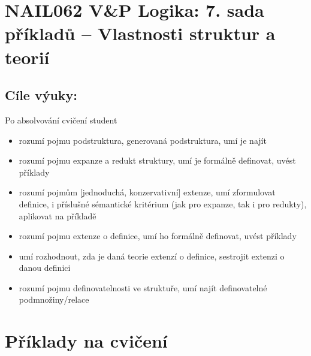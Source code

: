 \section*{NAIL062 V\&P Logika: 7. sada příkladů -- Vlastnosti struktur a teorií}


\subsection*{Cíle výuky:} Po absolvování cvičení student

    \begin{itemize}\setlength{\itemsep}{0pt}
        \item rozumí pojmu podstruktura, generovaná podstruktura, umí je najít
        \item rozumí pojmu expanze a redukt struktury, umí je formálně definovat, uvést příklady
        \item rozumí pojmům [jednoduchá, konzervativní] extenze, umí zformulovat definice, i příslušné sémantické kritérium (jak pro expanze, tak i pro redukty), aplikovat na příkladě
        \item rozumí pojmu extenze o definice, umí ho formálně definovat, uvést příklady
        \item umí rozhodnout, zda je daná teorie extenzí o definice, sestrojit extenzi o danou definici
        \item rozumí pojmu definovatelnosti ve struktuře, umí najít definovatelné podmnožiny/relace
    \end{itemize}
    

\section*{Příklady na cvičení}


